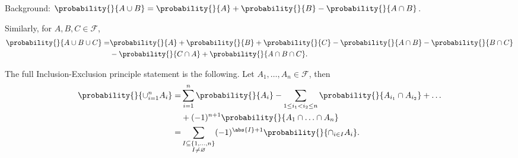 \begin{property}
\begin{enumerate}
        Background: \(\probability{}{A\cup B} = \probability{}{A} +\probability{}{B} -\probability{}{A\cap B} \).

        Similarly, for \(A,B,C \in \mathcal{F} \),
        \begin{align*}
            \probability{}{A\cup B \cup C} = &\probability{}{A} +\probability{}{B} +\probability{}{C} -\probability{}{A\cap B} -\probability{}{B\cap C}\\
            &- \probability{}{C\cap A} + \probability{}{A\cap B\cap C}.
        \end{align*}

        The full Inclusion-Exclusion principle statement is the following. Let \(A_1, \ldots ,A_n \in \mathcal{F}  \), then
        \begin{align*}
            \probability{}{\cup_{i=1}^{n}A_i} = &\sum\limits_{i=1}^{n} \probability{}{A_i} - \sum\limits_{1\leq i_1<i_2\leq n} \probability{}{A_{i_1}\cap A_{i_2}} + \ldots\\
            & + (-1)^{n+1} \probability{}{A_1\cap \ldots \cap A_n }\\
            =& \sum\limits_{\substack{I \subseteq \{1, \ldots ,n \}\\ I \neq \varnothing}} (-1)^{\abs{I} +1} \probability{}{\cap_{i\in I}A_i} .
        \end{align*}
    \end{enumerate}
\end{property}